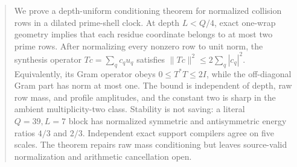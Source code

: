 \begin{abstract}
We prove a depth-uniform conditioning theorem for normalized collision rows in a
dilated prime-shell clock.  At depth $L<Q/4$, exact one-wrap geometry implies that
each residue coordinate belongs to at most two prime rows.  After normalizing every
nonzero row to unit norm, the synthesis operator $Tc=\sum_qc_qu_q$ satisfies
$\|Tc\|^2\le2\sum_q|c_q|^2$.  Equivalently, its Gram operator obeys
$0\le T^*T\le2I$, while the off-diagonal Gram part has norm at most one.  The bound
is independent of depth, raw row mass, and profile amplitudes, and the constant two is
sharp in the ambient multiplicity-two class.  Stability is not saving: a literal
$Q=39,L=7$ block has normalized symmetric and antisymmetric energy ratios $4/3$ and
$2/3$.  Independent exact support compilers agree on five scales.  The theorem repairs
raw mass conditioning but leaves source-valid normalization and arithmetic cancellation
open.
\end{abstract}
